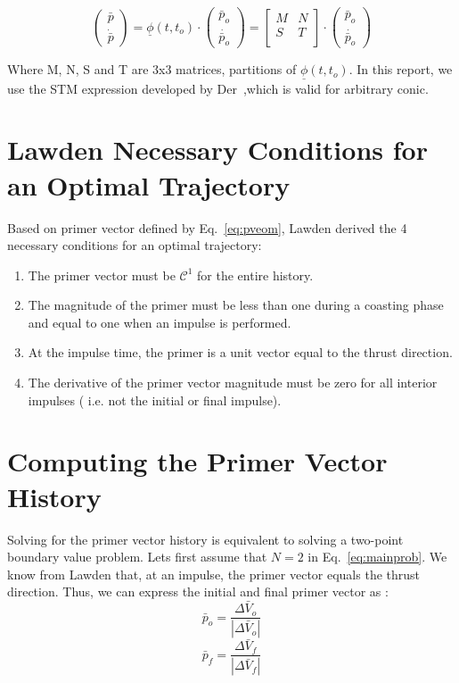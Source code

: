 \documentclass[12pt]{report}
\begin{document}
\begin{equation}
    \left( \begin{array}{c} \bar p \\ \dot{\bar p}
    \end{array} \right) = \underline{\phi}(t,t_{o})\cdot
    \left( \begin{array}{c} \bar p_{o} \\ \dot{\bar p_{o}}
    \end{array} \right) =
    \left[ \begin{array}{cc} M & N \\ S & T \\ \end{array} \right] \cdot
    \left( \begin{array}{c} \bar p_{o} \\ \dot{\bar p_{o}}
    \end{array} \right)
    \label{eq:stm}
\end{equation}

\noindent Where M, N, S and T are 3x3 matrices, partitions of
$\underline{\phi}(t,t_{o})$. In this report, we use the STM
expression developed by Der~\cite{Der97},which is valid for
arbitrary conic.\\

\section{Lawden Necessary Conditions for an Optimal Trajectory}

Based on primer vector defined by Eq.~\ref{eq:pveom}, Lawden
derived the 4 necessary conditions for an optimal trajectory:
\begin{enumerate}
\item The primer vector must be $\mathcal{C}^{1}$ for the
entire history.
\item The magnitude of the primer must be less than one during a coasting phase and equal
to one when an impulse is performed.
\item At the impulse time, the primer is a unit vector equal to the thrust direction.
\item The derivative of the primer vector magnitude must be zero for all interior impulses
( i.e. not the initial or final impulse).
\end{enumerate}

\section{Computing the Primer Vector History}
\noindent Solving for the primer vector history is equivalent to
solving a two-point boundary value problem. Lets first assume that
$N=2$ in Eq.~\ref{eq:mainprob}. We know from Lawden that, at an
impulse, the primer vector equals the thrust direction. Thus, we
can express the initial and final primer vector as :
\begin{equation}
\bar p_{o} = \frac{\Delta\bar V_{o}}{|\Delta\bar V_{o}|}
\end{equation}
\begin{equation}
\bar p_{f} = \frac{\Delta\bar V_{f}}{|\Delta\bar V_{f}|}
\end{equation}\\
\end{document}

